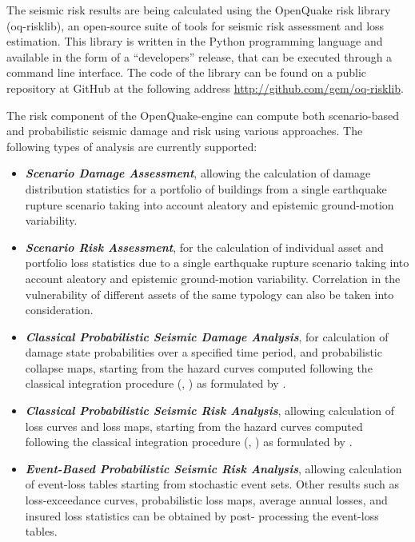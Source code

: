 
The seismic risk results are being calculated using the OpenQuake risk library
(oq-risklib), an open-source suite of tools for seismic risk assessment and
loss estimation. This library is written in the Python programming language
and available in the form of a ``developers'' release, that can be executed
through a command line interface. The code of the library can be found on a
public repository at GitHub at the following address
\href{http://github.com/gem/oq-risklib}{http://github.com/gem/oq-risklib}.

The risk component of the OpenQuake-engine can compute both scenario-based and
probabilistic seismic damage and risk using various approaches. The following
types of analysis are currently supported:

\begin{itemize}

    \item \textit{\textbf{Scenario Damage Assessment}}, allowing the
	calculation of damage distribution statistics for a portfolio of buildings
	from a single earthquake rupture scenario taking into account aleatory and
	epistemic ground-motion variability.

    \item \textit{\textbf{Scenario Risk Assessment}}, for the calculation of
	individual asset and portfolio loss statistics due to a single earthquake
	rupture scenario taking into account aleatory and epistemic ground-motion
	variability. Correlation in the vulnerability of different assets of the
	same typology can also be taken into consideration.

	\item \textit{\textbf{Classical Probabilistic Seismic Damage Analysis}}, for 
	calculation of damage state probabilities over a specified time period,  
	and probabilistic collapse maps, starting from the hazard curves 
	computed following the classical integration procedure (\cite{cornell1968}, 
	\citet{mcguire1976}) as formulated by \cite{field2003}.

    \item \textit{\textbf{Classical Probabilistic Seismic Risk Analysis}}, allowing
	calculation of loss curves and loss maps, starting from the hazard curves 
	computed following the classical integration procedure (\cite{cornell1968}, 
	\citet{mcguire1976}) as formulated by \cite{field2003}.

	\item \textit{\textbf{Event-Based Probabilistic Seismic Risk Analysis}}, 
	allowing calculation of event-loss tables starting from stochastic event sets.
	Other results such as loss-exceedance curves, probabilistic loss maps, 
	average annual losses, and insured loss statistics can be obtained by post-
	processing the event-loss tables.


\end{itemize}
